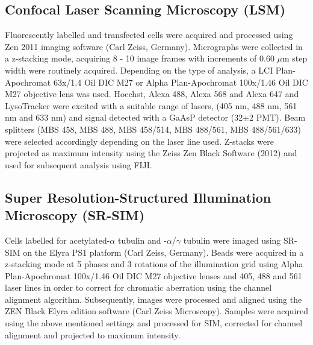 \subsection{Confocal Laser Scanning Microscopy (LSM)}
Fluorescently labelled and transfected cells were acquired and processed using Zen 2011 imaging software (Carl Zeiss, Germany). Micrographs were collected in a z-stacking mode, acquiring 8 - 10 image frames with increments of 0.60 $\mu$m step width were routinely acquired. Depending on the type of analysis, a LCI Plan-Apochromat 63x/1.4 Oil DIC M27 or Alpha Plan-Apochromat 100x/1.46 Oil DIC M27 objective lens was used. Hoechst, Alexa 488, Alexa 568 and Alexa 647 and LysoTracker were excited with a suitable range of lasers, (405 nm, 488 nm, 561 nm and 633 nm) and signal detected with a GaAsP detector (32$\pm$2 PMT). Beam splitters (MBS 458, MBS 488, MBS 458/514, MBS 488/561, MBS 488/561/633) were selected accordingly depending on the laser line used. Z-stacks were projected as maximum intensity using the Zeiss Zen Black Software (2012) and used for subsequent analysis using FIJI.

\subsection{Super Resolution-Structured Illumination Microscopy (SR-SIM)}
Cells labelled for acetylated-$\alpha$ tubulin and -$\alpha$/$\gamma$ tubulin were imaged using SR-SIM on the Elyra PS1 platform (Carl Zeiss, Germany). Beads were acquired in a z-stacking mode at 5 phases and 3 rotations  of the illumination grid using Alpha Plan-Apochromat 100x/1.46 Oil DIC M27 objective lenses and 405, 488 and 561 laser lines in order to correct for chromatic aberration using the channel alignment algorithm. Subsequently, images were processed and aligned using the ZEN Black Elyra edition software (Carl Zeiss Microscopy). Samples were acquired using the above mentioned settings and processed for SIM, corrected for channel alignment and projected to maximum intensity. 

